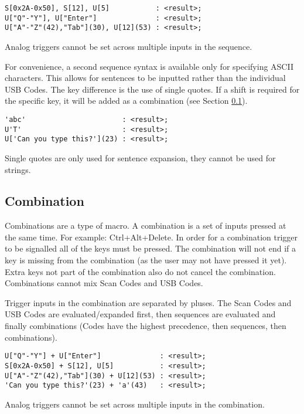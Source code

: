 \documentclass{kiibohd-template}
\begin{document}
\begin{lstlisting}
S[0x2A-0x50], S[12], U[5]           : <result>;
U["Q"-"Y"], U["Enter"]              : <result>;
U["A"-"Z"(42),"Tab"](30), U[12](53) : <result>;
\end{lstlisting}

Analog triggers cannot be set across multiple inputs in the sequence.

For convenience, a second sequence syntax is available only for specifying ASCII characters.
This allows for sentences to be inputted rather than the individual USB Codes.
The key difference is the use of single quotes.
If a shift is required for the specific key, it will be added as a combination (see Section \ref{subsec:Combination}).

\begin{lstlisting}
'abc'                       : <result>;
U'T'                        : <result>;
U['Can you type this?'](23) : <result>;
\end{lstlisting}

Single quotes are only used for sentence expansion, they cannot be used for strings.


\subsection{Combination}
\label{subsec:Combination}

Combinations are a type of macro.
A combination is a set of inputs pressed at the same time.
For example: Ctrl+Alt+Delete.
In order for a combination trigger to be signalled all of the keys must be pressed.
The combination will not end if a key is missing from the combination (as the user may not have pressed it yet).
Extra keys not part of the combination also do not cancel the combination.
Combinations cannot mix Scan Codes and USB Codes.

Trigger inputs in the combination are separated by pluses.
The Scan Codes and USB Codes are evaluated/expanded first, then sequences are evaluated and finally combinations (Codes have the highest precedence, then sequences, then combinations).

\begin{lstlisting}
U["Q"-"Y"] + U["Enter"]              : <result>;
S[0x2A-0x50] + S[12], U[5]           : <result>;
U["A"-"Z"(42),"Tab"](30) + U[12](53) : <result>;
'Can you type this?'(23) + 'a'(43)   : <result>;
\end{lstlisting}

Analog triggers cannot be set across multiple inputs in the combination.
\end{document}
